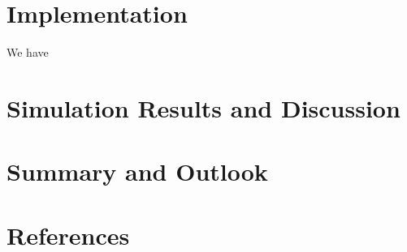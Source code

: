 \documentclass[11pt]{article}
\begin{document}
\section{Implementation}
We have

\section{Simulation Results and Discussion}

\section{Summary and Outlook}

\section{References}
\end{document}
